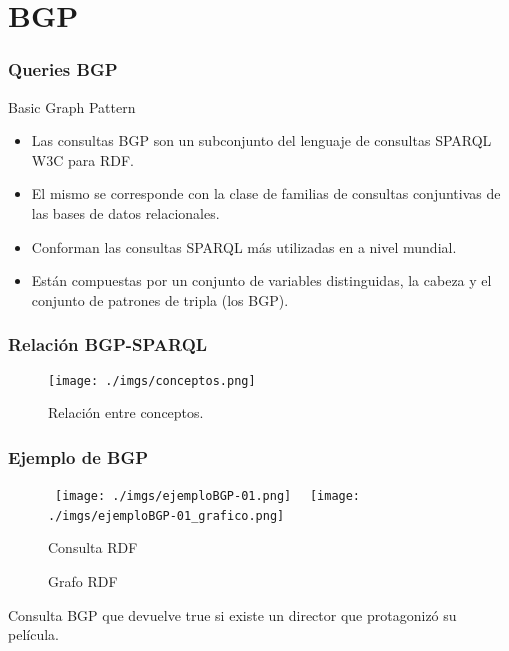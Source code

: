 \documentclass{beamer}
\begin{document}
\section{BGP}
\begin{frame}
\frametitle{Queries BGP}
\begin{exampleblock}{Basic Graph Pattern}
\begin{itemize}
\item<1-> Las consultas BGP son un subconjunto del lenguaje de consultas SPARQL W3C para RDF. 
\item<2-> El mismo se corresponde con la clase de familias de consultas conjuntivas de las bases de datos relacionales. 
\item<3-> Conforman las consultas SPARQL más utilizadas en a nivel mundial.
\item<4-> Están compuestas por un conjunto de variables distinguidas, la cabeza y el conjunto de patrones de tripla (los BGP).
\end{itemize}
\end{exampleblock}
\end{frame}

\begin{frame}
\frametitle{Relación BGP-SPARQL}
\begin{figure}[H] %
\begin{center}
\texttt{[image: ./imgs/conceptos.png]}
\caption{Relación entre conceptos.}
\end{center}
\end{figure}
\end{frame}
\begin{frame}
\frametitle{Ejemplo de BGP}
\begin{figure}
        \hbox{%
                \texttt{[image: ./imgs/ejemploBGP-01.png]}%
        }%
        \hbox{%
                \texttt{[image: ./imgs/ejemploBGP-01\_grafico.png]}%
        }%
        \ifdim\ht0>\ht2
                \setbox0\hbox{%
                        \texttt{[image: ./imgs/ejemploBGP-01.png]}%
                }%
        \else
                \setbox2\hbox{%
                        \texttt{[image: ./imgs/ejemploBGP-01\_grafico.png]}%
                }%
        \fi
        \noindent
        \parbox{.35\textwidth}{%
                \centering
                \caption{Consulta RDF}
                \label{fg:methods}
        }%
        \hfil
        \parbox{.35\textwidth}{%
                \centering
                \caption{Grafo RDF}
                \label{fg:method_detail}
        }
\end{figure}
\vspace*{1.2cm}
Consulta BGP que devuelve true si existe un director que protagonizó su película.
\end{frame}
\end{document}
